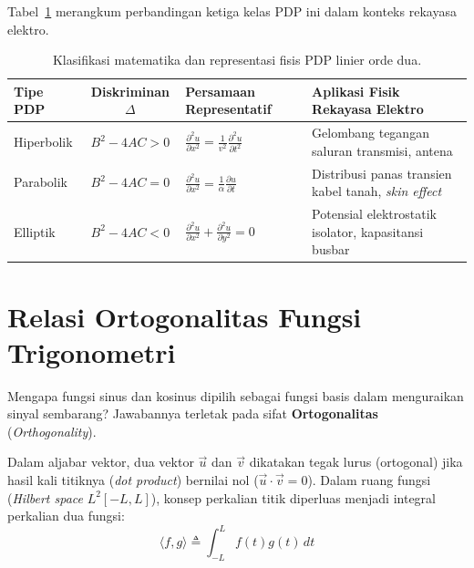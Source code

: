 \documentclass[11pt,a4paper]{article}
\theoremstyle{definition}
\begin{document}
Tabel~\ref{tab:pde_classification} merangkum perbandingan ketiga kelas PDP ini dalam konteks rekayasa elektro.

\begin{table}[htbp]
\centering
\caption{Klasifikasi matematika dan representasi fisis PDP linier orde dua.}
\label{tab:pde_classification}
\small
\begin{tabularx}{\linewidth}{l c >{\centering\arraybackslash}X >{\raggedright\arraybackslash}X}
\toprule
\textbf{Tipe PDP} & \textbf{Diskriminan $\Delta$} & \textbf{Persamaan Representatif} & \textbf{Aplikasi Fisik Rekayasa Elektro} \\
\midrule
Hiperbolik & $B^2 - 4AC > 0$ & $\frac{\partial^2 u}{\partial x^2} = \frac{1}{v^2}\frac{\partial^2 u}{\partial t^2}$ & Gelombang tegangan saluran transmisi, antena \\
Parabolik  & $B^2 - 4AC = 0$ & $\frac{\partial^2 u}{\partial x^2} = \frac{1}{\alpha}\frac{\partial u}{\partial t}$ & Distribusi panas transien kabel tanah, \textit{skin effect} \\
Elliptik   & $B^2 - 4AC < 0$ & $\frac{\partial^2 u}{\partial x^2} + \frac{\partial^2 u}{\partial y^2} = 0$ & Potensial elektrostatik isolator, kapasitansi busbar \\
\bottomrule
\end{tabularx}
\end{table}

\section{Relasi Ortogonalitas Fungsi Trigonometri}

Mengapa fungsi sinus dan kosinus dipilih sebagai fungsi basis dalam menguraikan sinyal sembarang? Jawabannya terletak pada sifat \textbf{Ortogonalitas} (\textit{Orthogonality}).

Dalam aljabar vektor, dua vektor $\vec{u}$ dan $\vec{v}$ dikatakan tegak lurus (ortogonal) jika hasil kali titiknya (\textit{dot product}) bernilai nol ($\vec{u} \cdot \vec{v} = 0$). Dalam ruang fungsi (\textit{Hilbert space} $L^2[-L, L]$), konsep perkalian titik diperluas menjadi integral perkalian dua fungsi:
\begin{equation}
    \langle f, g \rangle \triangleq \int_{-L}^{L} f(t) g(t) \, dt
    \label{eq:inner_product}
\end{equation}
\end{document}
